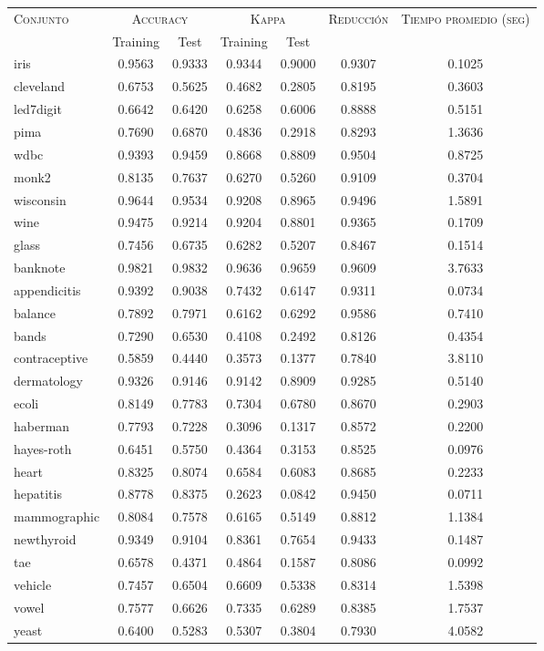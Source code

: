 \begin{table}[]
\centering
\begin{tabular}{l c c c c c c}
\hline
\multirow{2}{*}{\textsc{Conjunto}}
	& \multicolumn{2}{c}{\textsc{Accuracy}}
	& \multicolumn{2}{c}{\textsc{Kappa}}
	& \textsc{Reducción}
	& \textsc{Tiempo promedio (seg)} \\
	& Training & Test
	& Training & Test \\ 
\hline
\hline

iris & 0.9563 & 0.9333 & 0.9344 & 0.9000 & 0.9307 & 0.1025 \\
cleveland & 0.6753 & 0.5625 & 0.4682 & 0.2805 & 0.8195 & 0.3603 \\
led7digit & 0.6642 & 0.6420 & 0.6258 & 0.6006 & 0.8888 & 0.5151 \\
pima & 0.7690 & 0.6870 & 0.4836 & 0.2918 & 0.8293 & 1.3636 \\
wdbc & 0.9393 & 0.9459 & 0.8668 & 0.8809 & 0.9504 & 0.8725 \\
monk2 & 0.8135 & 0.7637 & 0.6270 & 0.5260 & 0.9109 & 0.3704 \\
wisconsin & 0.9644 & 0.9534 & 0.9208 & 0.8965 & 0.9496 & 1.5891 \\
wine & 0.9475 & 0.9214 & 0.9204 & 0.8801 & 0.9365 & 0.1709 \\
glass & 0.7456 & 0.6735 & 0.6282 & 0.5207 & 0.8467 & 0.1514 \\
banknote & 0.9821 & 0.9832 & 0.9636 & 0.9659 & 0.9609 & 3.7633 \\
appendicitis & 0.9392 & 0.9038 & 0.7432 & 0.6147 & 0.9311 & 0.0734 \\
balance & 0.7892 & 0.7971 & 0.6162 & 0.6292 & 0.9586 & 0.7410 \\
bands & 0.7290 & 0.6530 & 0.4108 & 0.2492 & 0.8126 & 0.4354 \\
contraceptive & 0.5859 & 0.4440 & 0.3573 & 0.1377 & 0.7840 & 3.8110 \\
dermatology & 0.9326 & 0.9146 & 0.9142 & 0.8909 & 0.9285 & 0.5140 \\
ecoli & 0.8149 & 0.7783 & 0.7304 & 0.6780 & 0.8670 & 0.2903 \\
haberman & 0.7793 & 0.7228 & 0.3096 & 0.1317 & 0.8572 & 0.2200 \\
hayes-roth & 0.6451 & 0.5750 & 0.4364 & 0.3153 & 0.8525 & 0.0976 \\
heart & 0.8325 & 0.8074 & 0.6584 & 0.6083 & 0.8685 & 0.2233 \\
hepatitis & 0.8778 & 0.8375 & 0.2623 & 0.0842 & 0.9450 & 0.0711 \\
mammographic & 0.8084 & 0.7578 & 0.6165 & 0.5149 & 0.8812 & 1.1384 \\
newthyroid & 0.9349 & 0.9104 & 0.8361 & 0.7654 & 0.9433 & 0.1487 \\
tae & 0.6578 & 0.4371 & 0.4864 & 0.1587 & 0.8086 & 0.0992 \\
vehicle & 0.7457 & 0.6504 & 0.6609 & 0.5338 & 0.8314 & 1.5398 \\
vowel & 0.7577 & 0.6626 & 0.7335 & 0.6289 & 0.8385 & 1.7537 \\
yeast & 0.6400 & 0.5283 & 0.5307 & 0.3804 & 0.7930 & 4.0582 \\


\end{tabular}
\end{table}
